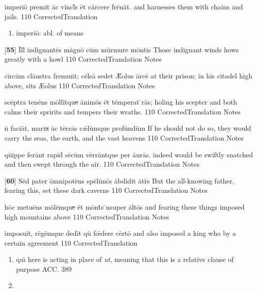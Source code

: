 \latline
  {\=imp\-er\-i\={\macron o} pr\-em\-it \=ac v\=incl\={\macron {\i}}s \=et c\=arc\-er\-e fr\={\macron e}n\=at.
}
  { and harnesses them with chains and jails. }
  {110}
  { CorrectedTranslation }
  { \begin{enumerate}
  	\item imperi\={o}:  abl. of means
  \end{enumerate} }


\latline
  {[\textbf{55}] \=Ill\={\macron {\i}} \=ind\-ign\-ant\={\macron e}s m\=agn\={\macron o} c\=um m\=urm\-ur\-e m\=ont\=is
}
  { Those indignant winds hows greatly with a howl }
  {110}
  { CorrectedTranslation }
  { Notes }


\latline
  {c\=irc\=um cl\={au}str\-a fr\-emu\=nt; c\=els\={\macron a} s\-ed\-et \={\AE}\-ol\-us \=arc\=e
}
  { at their prison; in his citadel high above, sits {\AE}olus }
  {110}
  { CorrectedTranslation }
  { Notes }


\latline
  {sc\={\macron e}ptr\-a t\-en\={\macron e}ns m\=oll\=itqu\sout{e }\=anim\={\macron o}s \=et t\=emp\-er\-at \={\macron {\i}}r\={\macron a}s;
}
  { holing his scepter and both calms their spririts and tempers their wraths. }
  {110}
  { CorrectedTranslation }
  { Notes }


\latline
  {n\={\macron {\i}} f\-ac\-i\=at, m\-ar\-i\sout{a }\=ac t\=err\={\macron a}s c\={\ae}l\=umqu\-e pr\-of\=und\=um
}
  { If he should not do so, they would carry the seas, the earth, and the vast heavens }
  {110}
  { CorrectedTranslation }
  { Notes }


\latline
  {q\={ui}pp\-e f\-er\=ant r\-ap\-id\={\macron {\i}} s\={\macron e}c\=um v\=err\=antqu\-e p\-er \={au}r\={\macron a}s.
}
  { indeed would be swiftly snatched and then swept through the air. }
  {110}
  { CorrectedTranslation }
  { Notes }


\latline
  {[\textbf{60}] S\=ed p\-at\-er \=omn\-ip\-ot\={\macron e}ns sp\={\macron e}l\=unc\={\macron {\i}}s \=abd\-id\-it \={\macron a}tr\={\macron {\i}}s
}
  { But the all-knowing father, fearing this, set these dark caverns }
  {110}
  { CorrectedTranslation }
  { Notes }


\latline
  {h\=oc m\-et\-u\={\macron e}ns m\={\macron o}l\=emqu\sout{e }\=et m\=ont\={\macron {\i}}s \={\macron {\i}}ns\-upe\-r \=alt\={\macron o}s
}
  { and fearing these things imposed high mountains above }
  {110}
  { CorrectedTranslation }
  { Notes }


\latline
  {\=imp\-os\-u\=it, r\={\macron e}g\=emqu\-e d\-ed\=it qu\={\macron {\i}} f\={\oe}d\-er\-e c\=ert\={\macron o}
}
  { and also imposed a king who by a certain agreement }
  {110}
  { CorrectedTranslation }
  { \begin{enumerate}
  	\item qu\={\i} here is acting in place of \emph{ut}, meaning that this is a relative clause of purpose ACC. 389
  	\item 
  \end{enumerate} }


